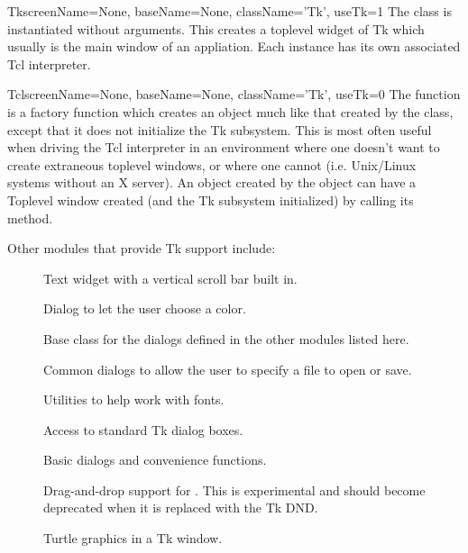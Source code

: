 \begin{classdesc}{Tk}{screenName=None, baseName=None, className='Tk', useTk=1}
The  class is instantiated without arguments.
This creates a toplevel widget of Tk which usually is the main window
of an appliation. Each instance has its own associated Tcl interpreter.
\end{classdesc}

\begin{funcdesc}{Tcl}{screenName=None, baseName=None, className='Tk', useTk=0}
The  function is a factory function which creates an object
much like that created by the  class, except that it does not
initialize the Tk subsystem.  This is most often useful when driving the Tcl
interpreter in an environment where one doesn't want to create extraneous
toplevel windows, or where one cannot (i.e. Unix/Linux systems without an X
server).  An object created by the  object can have a Toplevel
window created (and the Tk subsystem initialized) by calling its
 method.
\end{funcdesc}

Other modules that provide Tk support include:

\begin{description}

\item[]
Text widget with a vertical scroll bar built in.

\item[]
Dialog to let the user choose a color.

\item[]
Base class for the dialogs defined in the other modules listed here.

\item[]
Common dialogs to allow the user to specify a file to open or save.

\item[]
Utilities to help work with fonts.

\item[]
Access to standard Tk dialog boxes.

\item[]
Basic dialogs and convenience functions.

\item[]
Drag-and-drop support for .
This is experimental and should become deprecated when it is replaced 
with the Tk DND.

\item[]
Turtle graphics in a Tk window.

\end{description}

